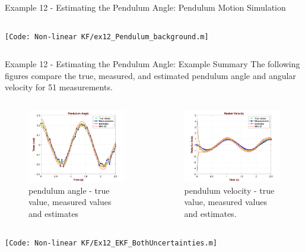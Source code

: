 \begin{frame}{Example 12 - Estimating the Pendulum Angle: Pendulum Motion Simulation}
\begin{columns}
\texttt{\tiny [Code: Non-linear KF/ex12\_Pendulum\_background.m]}

\end{columns}
\end{frame}


\begin{frame}{Example 12 - Estimating the Pendulum Angle: Example Summary}
The following figures compare the true, measured, and estimated pendulum angle and angular velocity for 51 measurements.
\begin{columns}
\begin{figure}
    \centering
    \includegraphics[width=0.95\linewidth]{Figures//Part3/Ex12_PendulumAngle.png}
    \caption{pendulum angle - true value, measured values and estimates}
\end{figure}
\begin{figure}
    \centering
    \includegraphics[width=0.95\linewidth]{Figures//Part3/Ex12_PendulumVelocity.png}
    \caption{pendulum velocity - true value, measured values and estimates.}
\end{figure}
\end{columns}

\texttt{\tiny [Code: Non-linear KF/Ex12\_EKF\_BothUncertainties.m]}
\end{frame}



